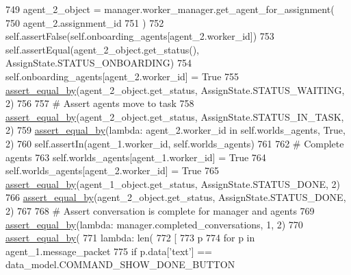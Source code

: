 \begin{DoxyCode}
749         agent\_2\_object = manager.worker\_manager.get\_agent\_for\_assignment(
750             agent\_2.assignment\_id
751         )
752         self.assertFalse(self.onboarding\_agents[agent\_2.worker\_id])
753         self.assertEqual(agent\_2\_object.get\_status(), AssignState.STATUS\_ONBOARDING)
754         self.onboarding\_agents[agent\_2.worker\_id] = \textcolor{keyword}{True}
755         \hyperlink{namespaceparlai_1_1mturk_1_1core_1_1test_1_1test__full__system_a0b463246d35658a2e422010f13dcf819}{assert\_equal\_by}(agent\_2\_object.get\_status, AssignState.STATUS\_WAITING, 2)
756 
757         \textcolor{comment}{# Assert agents move to task}
758         \hyperlink{namespaceparlai_1_1mturk_1_1core_1_1test_1_1test__full__system_a0b463246d35658a2e422010f13dcf819}{assert\_equal\_by}(agent\_2\_object.get\_status, AssignState.STATUS\_IN\_TASK, 2)
759         \hyperlink{namespaceparlai_1_1mturk_1_1core_1_1test_1_1test__full__system_a0b463246d35658a2e422010f13dcf819}{assert\_equal\_by}(\textcolor{keyword}{lambda}: agent\_2.worker\_id \textcolor{keywordflow}{in} self.worlds\_agents, \textcolor{keyword}{True}, 2)
760         self.assertIn(agent\_1.worker\_id, self.worlds\_agents)
761 
762         \textcolor{comment}{# Complete agents}
763         self.worlds\_agents[agent\_1.worker\_id] = \textcolor{keyword}{True}
764         self.worlds\_agents[agent\_2.worker\_id] = \textcolor{keyword}{True}
765         \hyperlink{namespaceparlai_1_1mturk_1_1core_1_1test_1_1test__full__system_a0b463246d35658a2e422010f13dcf819}{assert\_equal\_by}(agent\_1\_object.get\_status, AssignState.STATUS\_DONE, 2)
766         \hyperlink{namespaceparlai_1_1mturk_1_1core_1_1test_1_1test__full__system_a0b463246d35658a2e422010f13dcf819}{assert\_equal\_by}(agent\_2\_object.get\_status, AssignState.STATUS\_DONE, 2)
767 
768         \textcolor{comment}{# Assert conversation is complete for manager and agents}
769         \hyperlink{namespaceparlai_1_1mturk_1_1core_1_1test_1_1test__full__system_a0b463246d35658a2e422010f13dcf819}{assert\_equal\_by}(\textcolor{keyword}{lambda}: manager.completed\_conversations, 1, 2)
770         \hyperlink{namespaceparlai_1_1mturk_1_1core_1_1test_1_1test__full__system_a0b463246d35658a2e422010f13dcf819}{assert\_equal\_by}(
771             \textcolor{keyword}{lambda}: len(
772                 [
773                     p
774                     \textcolor{keywordflow}{for} p \textcolor{keywordflow}{in} agent\_1.message\_packet
775                     \textcolor{keywordflow}{if} p.data[\textcolor{stringliteral}{'text'}] == data\_model.COMMAND\_SHOW\_DONE\_BUTTON

\end{DoxyCode}

